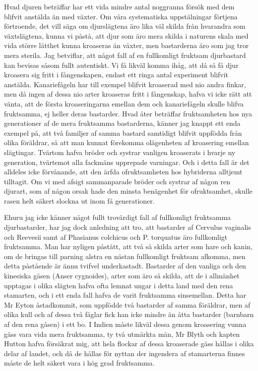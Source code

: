 Hvad djuren beträffar har ett vida mindre antal noggranna försök med dem blifvit anstälda än med växter. Om våra systematiska uppstälningar förtjena förtroende, det vill säga om djurslägtena äro lika väl skilda från hvarandra som växtslägtena, kunna vi påstå, att djur som äro mera skilda i naturens skala med vida större lätthet kunna kroaseras än växter, men bastarderna äro som jag tror mera sterila. Jag betviflar, att något fall af en fullkomligt fruktsam djurbastard kan bevisas såsom fullt autentiskt. Vi få likväl komma ihåg, att då så få djur kroasera sig fritt i fångenskapen, endast ett ringa antal experiment blifvit anstälda. Kanariefågeln har till exempel blifvit kroaserad med nio andra finkar, men då ingen af dessa nio arter kroaseras fritt i fångenskap, hafva vi icke rätt att vänta, att de första kroaseringarna emellan dem och kanariefågeln skulle blifva fruktsamma, ej heller deras bastarder. Hvad åter beträffar fruktsamheten hos nya generationer af de mera fruktsamma bastarderna, känner jag knappt ett enda exempel på, att två familjer af samma bastard samtidigt blifvit uppfödda från olika föräldrar, så att man kunnat förekomma olägenheten af kroasering emellan slägtingar. Tvärtom hafva bröder och systrar vanligen kroaserats i hvarje ny generation, tvärtemot alla fackmäns upprepade varningar. Och i detta fall är det alldeles icke förvånande, att den ärfda ofruktsamheten hos hybriderna alltjemt tilltagit. Om vi med afsigt sammanparade bröder och systrar af någon ren djurart, som af någon orsak hade den minsta benägenhet för ofruktsamhet, skulle rasen helt säkert slockna ut inom få generationer.

Ehuru jag icke känner något fullt trovärdigt fall af fullkomligt fruktsamma djurbastarder, har jag dock anledning att tro, att bastarder af Cervulus vaginalis och Reevesii samt af Phasianus colchicus och P. torquatus äro fullkomligt fruktsamma. Man har nyligen påstått, att två så skilda arter som hare och kanin, om de bringas till parning alstra en nästan fullkomligt fruktsam afkomma, men detta påstående är ännu tvifvel underkastadt. Bastarder af den vanliga och den kinesiska gåsen (Anser cygnoides), arter som äro så skilda, att de i allmänhet upptagas i olika slägten hafva ofta lemnat ungar i detta land med den rena stamarten, och i ett enda fall hafva de varit fruktsamma sinsemellan. Detta har Mr Eyton åstadkommit, som uppfödde två bastarder af samma föräldrar, men af olika kull och af dessa två fåglar fick han icke mindre än åtta bastarder (barnbarn af den rena gåsen) i ett bo. I Indien måste likväl dessa genom kroasering vunna gäss vara vida mera fruktsamma, ty två utmärkta män, Mr Blyth och kapten Hutton hafva försäkrat mig, att hela flockar af dessa kroaserade gäss hållas i olika delar af landet, och då de hållas för nyttan der ingendera af stamarterna finnes måste de helt säkert vara i hög grad fruktsamma.

